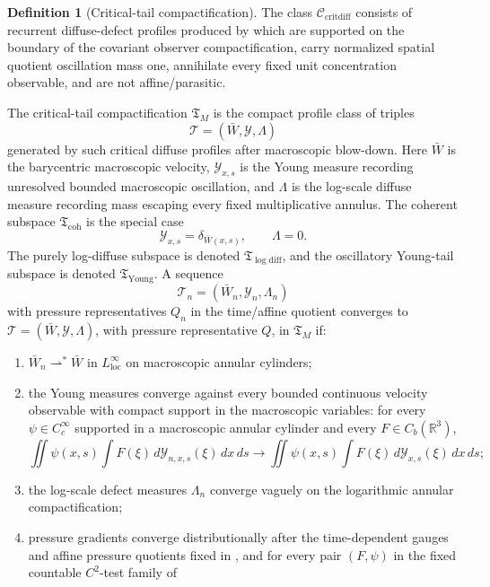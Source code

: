 \documentclass[11pt]{amsart}
\numberwithin{equation}{section}
\theoremstyle{plain}
\theoremstyle{definition}
\newtheorem{definition}[definition]{Definition}
\theoremstyle{remark}
\newcommand{\loc}{\mathrm{loc}}
\newcommand{\Ccritdiff}{\mathcal C_{\mathrm{critdiff}}}
\newcommand{\Tcrit}{\mathfrak T_M}
\newcommand{\Tcoh}{\mathfrak T_{\mathrm{coh}}}
\newcommand{\Tyoung}{\mathfrak T_{\mathrm{Young}}}
\newcommand{\Tlogdiff}{\mathfrak T_{\log\mathrm{diff}}}
\begin{document}
\begin{definition}[Critical-tail compactification]
\label{def:critical-diffuse-tail-strata}
The class \(\Ccritdiff\) consists of recurrent diffuse-defect profiles produced
by  which are supported on the boundary of
the covariant observer compactification, carry normalized spatial quotient oscillation
mass one, annihilate every fixed unit concentration observable, and are not
affine/parasitic.

The critical-tail compactification \(\Tcrit\) is the compact profile class of
triples
\[
   \mathcal T=(\bar W,\mathcal Y,\Lambda)
\]
generated by such critical diffuse profiles after macroscopic blow-down.  Here
\(\bar W\) is the barycentric macroscopic velocity, \(\mathcal Y_{x,s}\) is the
Young measure recording unresolved bounded macroscopic oscillation, and
\(\Lambda\) is the log-scale diffuse measure recording mass escaping every fixed
multiplicative annulus.  The coherent subspace \(\Tcoh\) is the special case
\[
   \mathcal Y_{x,s}=\delta_{\bar W(x,s)},\qquad \Lambda=0.
\]
The purely log-diffuse subspace is denoted \(\Tlogdiff\), and the oscillatory
Young-tail subspace is denoted \(\Tyoung\).
A sequence
\[
   \mathcal T_n=(\bar W_n,\mathcal Y_n,\Lambda_n)
\]
with pressure representatives \(Q_n\) in the time/affine quotient converges to
\(\mathcal T=(\bar W,\mathcal Y,\Lambda)\), with pressure representative \(Q\),
in \(\Tcrit\) if:
\begin{enumerate}[label=\textup{(\roman*)}]
   \item \(\bar W_n\rightharpoonup^\ast\bar W\) in
   \(L^\infty_{\loc}\) on macroscopic annular cylinders;
   \item the Young measures converge against every bounded continuous velocity
   observable with compact support in the macroscopic variables: for every
   \(\psi\in C_c^\infty\) supported in a macroscopic annular cylinder and every
   \(F\in C_b(\mathbb R^3)\),
   \[
      \iint \psi(x,s)
      \int F(\xi)\,d\mathcal Y_{n,x,s}(\xi)\,dx\,ds
      \longrightarrow
      \iint \psi(x,s)
      \int F(\xi)\,d\mathcal Y_{x,s}(\xi)\,dx\,ds ;
   \]
   \item the log-scale defect measures \(\Lambda_n\) converge vaguely on the
   logarithmic annular compactification;
   \item pressure gradients converge distributionally after the time-dependent
   gauges and affine pressure quotients fixed in
   , and for every pair
   \((F,\psi)\) in the fixed countable \(C^2\)-test family of

\end{enumerate}
\end{definition}
\end{document}
